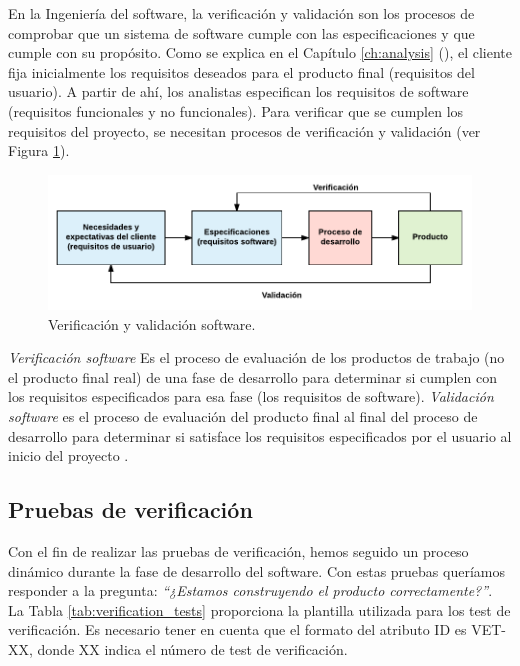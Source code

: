 En la Ingeniería del \Gls{software}, la verificación y validación son los procesos de comprobar que un sistema de \gls{software} cumple con las especificaciones y que cumple con su propósito. Como se explica en el Capítulo \ref{ch:analysis} (\textit{}), el cliente fija inicialmente los requisitos deseados para el producto final (requisitos del usuario). A partir de ahí, los analistas especifican los requisitos de \gls{software} (requisitos funcionales y no funcionales). Para verificar que se cumplen los requisitos del proyecto, se necesitan procesos de verificación y validación (ver Figura \ref{fig:verification_validation}).


\begin{figure}[htbp]
 	\centering
 	\includegraphics[width=12cm]{figures/verificacion_validacion_diagrama}
 	\caption{Verificación y validación \gls{software}.}
	\label{fig:verification_validation}
\end{figure}

\textit{Verificación \Gls{software}} Es el proceso de evaluación de los productos de trabajo (no el producto final real) de una fase de desarrollo para determinar si cumplen con los requisitos especificados para esa fase (los requisitos de \gls{software}). \textit{Validación \gls{software}} es el proceso de evaluación del producto final al final del proceso de desarrollo para determinar si satisface los requisitos especificados por el usuario al inicio del proyecto \cite{verification}.

\subsection{Pruebas de verificación}

Con el fin de realizar las pruebas de verificación, hemos seguido un proceso dinámico durante la fase de desarrollo del \gls{software}. Con estas pruebas queríamos responder a la pregunta: \emph{``¿Estamos construyendo el producto correctamente?''}. La Tabla \ref{tab:verification_tests} proporciona la plantilla utilizada para los test de verificación. Es necesario tener en cuenta que el formato del atributo ID es VET-XX, donde XX indica el número de test de verificación.

